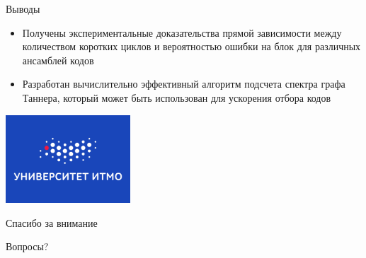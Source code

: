 \documentclass[t,13pt,graphics=pdflatex,xcolor=table,aspectratio=43]{beamer}
\begin{document}
\begin{frame}{Выводы}
  \begin{itemize}
    \item Получены экспериментальные доказательства прямой зависимости между количеством коротких циклов 
      и вероятностью ошибки на блок для различных ансамблей кодов
    \item Разработан вычислительно эффективный алгоритм подсчета спектра графа Таннера, который может
      быть использован для ускорения отбора кодов
  \end{itemize}
\end{frame}

\begingroup
{}
\begin{frame}[plain]
\color{white}
\centering\bfseries
\includegraphics[width=0.35\textwidth]{itmo_small_blue_rus.png}

\vspace{0pt plus 0.3filll}

{\Large Спасибо за внимание \par}

\vspace{0pt plus 0.3filll}

{\Large Вопросы?}

\vspace{0pt plus 0.3filll}
\vspace{0pt plus 1filll}
\end{frame}
\endgroup
\end{document}
